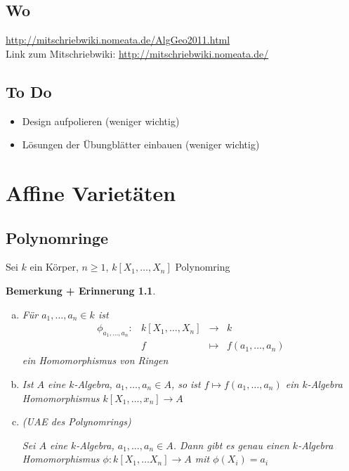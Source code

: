 \documentclass[a4paper, 12pt, numbers=noendperiod, chapterprefix=true]{scrbook}
\theoremstyle{break}
\newtheorem{BemErinn}[Def]{Bemerkung + Erinnerung}
\theoremstyle{nonumberbreak}
\theoremstyle{nonumberplain}
\begin{document}
\section*{Wo}
\url{http://mitschriebwiki.nomeata.de/AlgGeo2011.html}\\
Link zum Mitschriebwiki: \url{http://mitschriebwiki.nomeata.de/}

\section*{To Do}\begin{itemize}
\item Design aufpolieren (weniger wichtig)
\item L\"osungen der \"Ubungbl\"atter einbauen (weniger wichtig)
\end{itemize}


\chapter{Affine Variet\"aten}

\section{Polynomringe}

Sei $k$ ein K\"orper, $n \geq 1$, $k[X_1,\dots,X_n]$ Polynomring

\begin{BemErinn}\label{bemerinn:1.1}
\begin{enumerate}[a)]
\item F\"ur $a_1, \dots, a_n \in k$ ist
	\[\begin{array}{lccc}
		\phi_{a_1,\dots,a_n}: &k[X_1, \dots, X_n] &\to& k \\
		&f &\mapsto& f(a_1, \dots, a_n)
	\end{array}\]
	ein Homomorphismus von Ringen
	
\item Ist $A$ eine $k$-Algebra, $a_1,\dots, a_n \in A$, so ist $f \mapsto f(a_1, \dots,a_n)$ ein $k$-Algebra Homomorphismus $k[X_1,\dots,x_n] \to A$
	
\item (UAE des Polynomrings)

	Sei $A$ eine $k$-Algebra, $a_1,\dots,a_n\in A$. Dann gibt es genau einen $k$-Algebra Homomorphismus $\phi:k[X_1,\dots X_n] \to A$ mit $\phi(X_i) = a_i$\label{bemerinn:1.1.c}
\end{enumerate}
\end{BemErinn}
\end{document}
